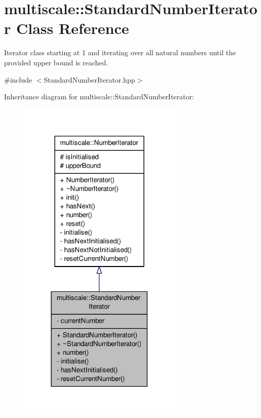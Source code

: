 \hypertarget{classmultiscale_1_1StandardNumberIterator}{\section{multiscale\-:\-:Standard\-Number\-Iterator Class Reference}
\label{classmultiscale_1_1StandardNumberIterator}
}


Iterator class starting at 1 and iterating over all natural numbers until the provided upper bound is reached.  




{\ttfamily \#include $<$Standard\-Number\-Iterator.\-hpp$>$}



Inheritance diagram for multiscale\-:\-:Standard\-Number\-Iterator\-:\nopagebreak
\begin{figure}[H]
\begin{center}
\leavevmode
\includegraphics[width=222pt]{classmultiscale_1_1StandardNumberIterator__inherit__graph}
\end{center}
\end{figure}


